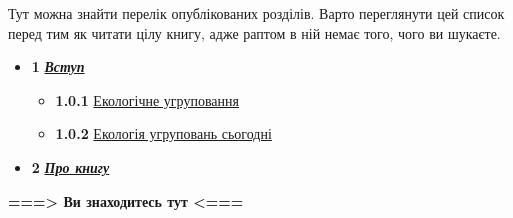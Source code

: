 \documentclass[
  11pt,
]{book}
\begin{document}
Тут можна знайти перелік опублікованих розділів. Варто переглянути цей список перед тим як читати цілу книгу, адже раптом в ній немає того, чого ви шукаєте.

\begin{itemize}
\item
  \textbf{1} \hyperref[introduction]{\textbf{\emph{Вступ}}}

  \begin{itemize}
  \item
    \textbf{1.0.1} \hyperref[community-def]{Екологічне угруповання}
  \item
    \textbf{1.0.2} \hyperref[comm-ecol-today]{Екологія угруповань сьогодні}
  \end{itemize}
\item
  \textbf{2} \hyperref[about-book]{\textbf{\emph{Про книгу}}}
\end{itemize}

\textbf{{===\textgreater{} Ви знаходитесь тут \textless===}}
\end{document}

